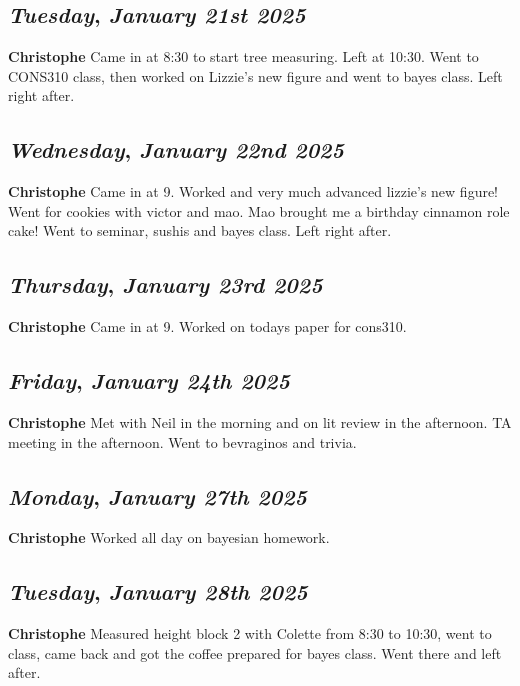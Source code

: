 \def\day{\textit{January 21st 2025}}
\def\weekday{\textit{Tuesday}}
\subsection*{\weekday, \day}
\textbf {Christophe}
Came in at 8:30 to start tree measuring. Left at 10:30. Went to CONS310 class, then worked on Lizzie's new figure and went to bayes class. Left right after.

\def\day{\textit{January 22nd 2025}}
\def\weekday{\textit{Wednesday}}
\subsection*{\weekday, \day}
\textbf {Christophe}
Came in at 9. Worked and very much advanced lizzie's new figure! Went for cookies with victor and mao. Mao brought me a birthday cinnamon role cake! Went to seminar, sushis and bayes class. Left right after.

\def\day{\textit{January 23rd 2025}}
\def\weekday{\textit{Thursday}}
\subsection*{\weekday, \day}
\textbf {Christophe}
Came in at 9. Worked on todays paper for cons310.
\def\day{\textit{January 24th 2025}}
\def\weekday{\textit{Friday}}
\subsection*{\weekday, \day}
\textbf {Christophe}
Met with Neil in the morning and on lit review in the afternoon. TA meeting in the afternoon. Went to bevraginos and trivia. 

\def\day{\textit{January 27th 2025}}
\def\weekday{\textit{Monday}}
\subsection*{\weekday, \day}
\textbf {Christophe}
Worked all day on bayesian homework.

\def\day{\textit{January 28th 2025}}
\def\weekday{\textit{Tuesday}}
\subsection*{\weekday, \day}
\textbf {Christophe}
Measured height block 2 with Colette from 8:30 to 10:30, went to class, came back and got the coffee prepared for bayes class. Went there and left after. 

